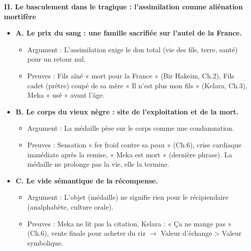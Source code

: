 \documentclass[11pt]{article}
\begin{document}
\begin{exoresolu}
\textbf{II. Le basculement dans le tragique : l'assimilation comme aliénation mortifère}
\begin{itemize}
    \item \textbf{A. Le prix du sang : une famille sacrifiée sur l'autel de la France.}
    \begin{itemize}
        \item Argument : L'assimilation exige le don total (vie des fils, terre, santé) pour un retour nul.
        \item Preuves : Fils aîné « mort pour la France » (Bir Hakeim, Ch.2), Fils cadet (prêtre) coupé de sa mère « Il n'est plus mon fils » (Kelara, Ch.3), Meka « usé » avant l'âge.
    \end{itemize}
    \item \textbf{B. Le corps du vieux nègre : site de l'exploitation et de la mort.}
    \begin{itemize}
        \item Argument : La médaille pèse sur le corps comme une condamnation.
        \item Preuves : Sensation « fer froid contre sa peau » (Ch.6), crise cardiaque immédiate après la remise, « Meka est mort » (dernière phrase). La médaille ne prolonge pas la vie, elle la termine.
    \end{itemize}
    \item \textbf{C. Le vide sémantique de la récompense.}
    \begin{itemize}
        \item Argument : L'objet (médaille) ne signifie rien pour le récipiendaire (analphabète, culture orale).
        \item Preuves : Meka ne lit pas la citation, Kelara : « Ça ne mange pas » (Ch.6), vente finale pour acheter du riz $\to$ Valeur d'échange > Valeur symbolique.
    \end{itemize}
\end{itemize}


\end{exoresolu}
\end{document}
